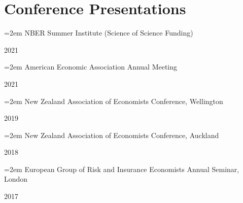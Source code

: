 \documentclass[11pt,oneside]{memoir}
\newcommand{\entry}[2]{\par\parbox[t]{0.9\linewidth}{\strut\raggedright\hangindent=2em #2\strut}\hfill#1}
\begin{document}
\section{Conference Presentations}

\entry{2021}{NBER Summer Institute (Science of Science Funding)}
\entry{2021}{American Economic Association Annual Meeting}
\entry{2019}{New Zealand Association of Economists Conference, Wellington}
\entry{2018}{New Zealand Association of Economists Conference, Auckland}
\entry{2017}{European Group of Risk and Insurance Economists Annual Seminar, London}
\end{document}
